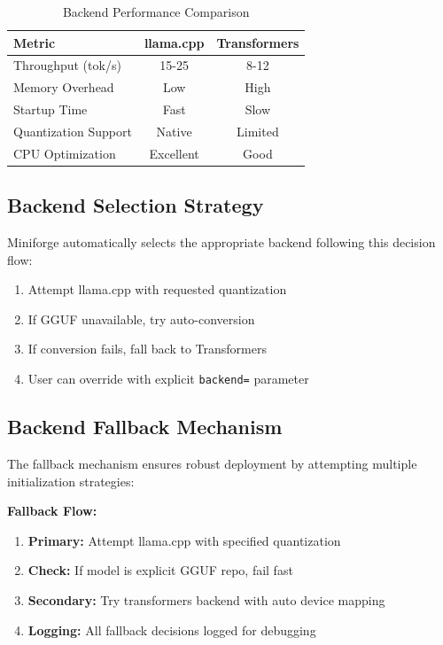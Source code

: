 \begin{table}[h]
\centering
\caption{Backend Performance Comparison}
\label{tab:backend_comparison}
\begin{tabular}{lcc}
\toprule
\textbf{Metric} & \textbf{llama.cpp} & \textbf{Transformers} \\
\midrule
Throughput (tok/s) & 15-25 & 8-12 \\
Memory Overhead & Low & High \\
Startup Time & Fast & Slow \\
Quantization Support & Native & Limited \\
CPU Optimization & Excellent & Good \\
\bottomrule
\end{tabular}
\end{table}

\subsection{Backend Selection Strategy}

Miniforge automatically selects the appropriate backend following this decision flow:

\begin{enumerate}
    \item Attempt llama.cpp with requested quantization
    \item If GGUF unavailable, try auto-conversion
    \item If conversion fails, fall back to Transformers
    \item User can override with explicit \texttt{backend=} parameter
\end{enumerate}

\subsection{Backend Fallback Mechanism}

The fallback mechanism ensures robust deployment by attempting multiple initialization strategies:

\textbf{Fallback Flow:}
\begin{enumerate}
    \item \textbf{Primary:} Attempt llama.cpp with specified quantization
    \item \textbf{Check:} If model is explicit GGUF repo, fail fast
    \item \textbf{Secondary:} Try transformers backend with auto device mapping
    \item \textbf{Logging:} All fallback decisions logged for debugging
\end{enumerate}

